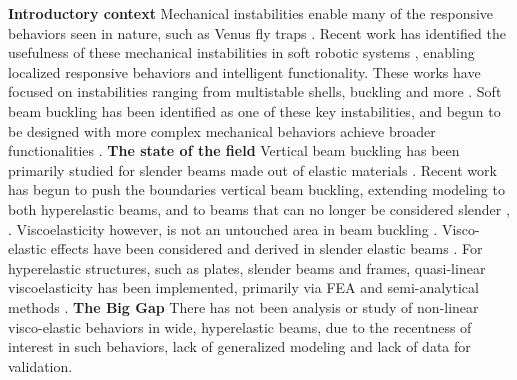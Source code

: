 
\renewcommand{\outlinei}{enumerate}
\renewcommand{\outlineii}{itemize}
\begin{outline}
    \1 \textbf{Introductory context}
        \2 Mechanical instabilities enable many of the responsive behaviors seen in nature, such as Venus fly traps \cite{Baumgartner_VenusFlyTrap}. Recent work has identified the usefulness of these mechanical instabilities in soft robotic systems \cite{Pal_ExploitingInstab}, enabling localized responsive behaviors and intelligent functionality. These works have focused on instabilities ranging from multistable shells, buckling and more \cite{Lu_HarnessingInstab}. Soft beam buckling has been identified as one of these key instabilities, and begun to be designed with more complex mechanical behaviors achieve broader functionalities \cite{Narayanan_LeveragingInstab}.
    \1 \textbf{The state of the field}
        \2 Vertical beam buckling has been primarily studied for slender beams made out of elastic materials \cite{TimoshenkoElastStab}. Recent work has begun to push the boundaries vertical beam buckling, extending modeling to both hyperelastic beams, and to beams that can no longer be considered slender \cite{Chen&Jin_Buckling}, \cite{Chen&Jin_PostBuckling}.
        \2 Viscoelasticity however, is not an untouched area in beam buckling \cite{Spanguolo_LargePlanarDef}. Visco-elastic effects have been considered and derived in slender elastic beams \cite{Hilton_TimoViscoBeam} \cite{Vinogradov_ViscoBeamColumns}. For hyperelastic structures, such as plates, slender beams and frames, quasi-linear viscoelasticity has been implemented, primarily via FEA and semi-analytical methods \cite{Dadgar_2dViscoHyperBeamFrames} \cite{Dastjerdi_ViscoLargeDefPlate}.
    \1 \textbf{The Big Gap}
        \2 There has not been analysis or study of non-linear visco-elastic behaviors in wide, hyperelastic beams, due to the recentness of interest in such behaviors, lack of generalized modeling and lack of data for validation.
\end{outline}